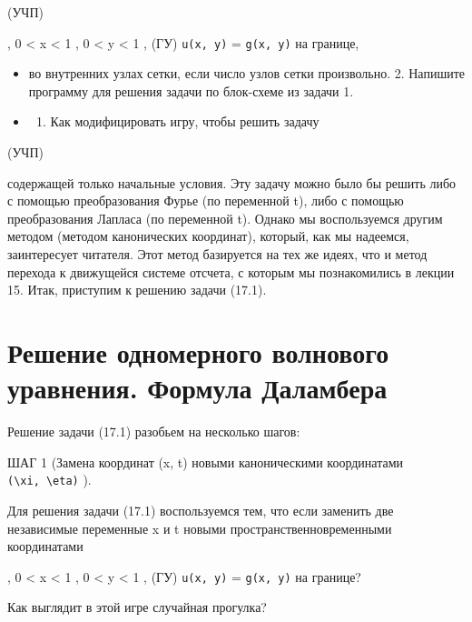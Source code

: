\documentclass[
  ukrainian,
]{article}
\providecommand{\tightlist}{%
  \setlength{\itemsep}{0pt}\setlength{\parskip}{0pt}}
\begin{document}
(УЧП)

, 0 \textless{} x \textless{} 1 , 0 \textless{} y \textless{} 1 , (ГУ)
\texttt{u(x,\ y)} = \texttt{g(x,\ y)} на границе,

\begin{itemize}
\item
  во внутренних узлах сетки, если число узлов сетки произвольно. 2.
  Напишите программу для решения задачи по блок-схеме из задачи 1.
\item
  \begin{enumerate}
  \def\labelenumi{\arabic{enumi}.}
  \setcounter{enumi}{2}
  \tightlist
  \item
    Как модифицировать игру, чтобы решить задачу
  \end{enumerate}
\end{itemize}

(УЧП)

содержащей только начальные условия. Эту задачу можно было бы решить
либо с помощью преобразования Фурье (по переменной t), либо с помощью
преобразования Лапласа (по переменной t). Однако мы воспользуемся другим
методом (методом канонических координат), который, как мы надеемся,
заинтересует читателя. Этот метод базируется на тех же идеях, что и
метод перехода к движущейся системе отсчета, с которым мы познакомились
в лекции 15. Итак, приступим к решению задачи (17.1).

\section{Решение одномерного волнового уравнения. Формула
Даламбера}\label{ux440ux435ux448ux435ux43dux438ux435-ux43eux434ux43dux43eux43cux435ux440ux43dux43eux433ux43e-ux432ux43eux43bux43dux43eux432ux43eux433ux43e-ux443ux440ux430ux432ux43dux435ux43dux438ux44f.-ux444ux43eux440ux43cux443ux43bux430-ux434ux430ux43bux430ux43cux431ux435ux440ux430}

Решение задачи (17.1) разобьем на несколько шагов:

ШАГ 1 (Замена координат (x, t) новыми каноническими координатами
\texttt{(\textbackslash{}xi,\ \textbackslash{}eta)} ).

Для решения задачи (17.1) воспользуемся тем, что если заменить две
независимые переменные x и t новыми пространственновременными
координатами

, 0 \textless{} x \textless{} 1 , 0 \textless{} y \textless{} 1 , (ГУ)
\texttt{u(x,\ y)} = \texttt{g(x,\ y)} на границе?

Как выглядит в этой игре случайная прогулка?
\end{document}
